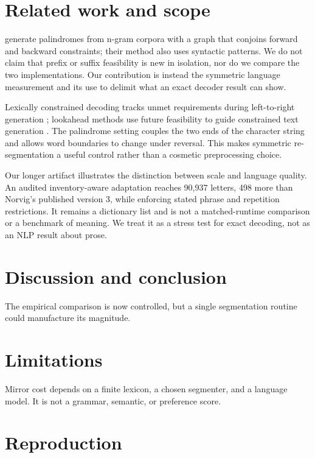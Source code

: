 \documentclass[11pt]{article}
\begin{document}
\section{Related work and scope}

\citet{papadopoulos2015palindromes} generate palindromes from n-gram corpora
with a graph that conjoins forward and backward constraints; their method also
uses syntactic patterns. We do not claim that prefix or suffix feasibility is
new in isolation, nor do we compare the two implementations. Our contribution
is instead the symmetric language measurement and its use to delimit what an
exact decoder result can show.

Lexically constrained decoding tracks unmet requirements during left-to-right
generation \citep{hokamp2017grid,post2018fast}; lookahead methods use future
feasibility to guide constrained text generation \citep{lu2022astar}. The
palindrome setting couples the two ends of the character string and allows word
boundaries to change under reversal. This makes symmetric re-segmentation a
useful control rather than a cosmetic preprocessing choice.

Our longer artifact illustrates the distinction between scale and language
quality. An audited inventory-aware adaptation reaches 90,937 letters, 498
more than Norvig's published version 3, while enforcing stated phrase and
repetition restrictions. It remains a dictionary list and is not a
matched-runtime comparison or a benchmark of meaning. We treat it as a stress
test for exact decoding, not as an NLP result about prose.

\section{Discussion and conclusion}

The empirical comparison is now controlled, but a single segmentation routine could manufacture its magnitude.

\section*{Limitations}

Mirror cost depends on a finite lexicon, a chosen segmenter, and a language model. It is not a grammar, semantic, or preference score.



\appendix
\section{Reproduction}
\end{document}
